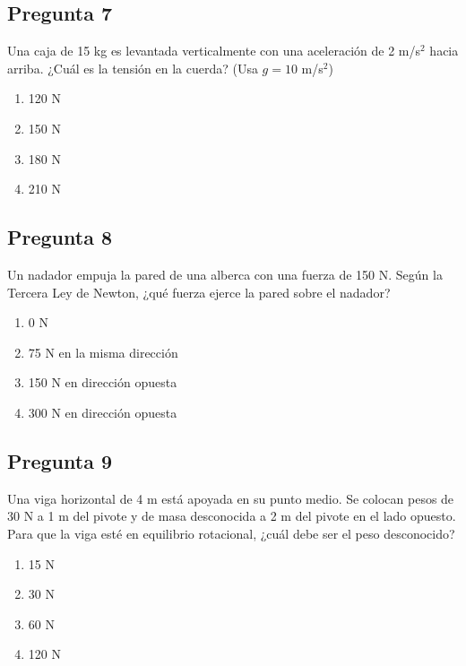 \begin{preguntabox}
\subsection{Pregunta 7}
Una caja de 15 kg es levantada verticalmente con una aceleración de 2 m/s$^2$ hacia arriba. ¿Cuál es la tensión en la cuerda? (Usa $g = 10$ m/s$^2$)

\begin{enumerate}
    \item[A)] 120 N
    \item[B)] 150 N
    \item[C)] 180 N
    \item[D)] 210 N
\end{enumerate}
\end{preguntabox}

\begin{preguntabox}
\subsection{Pregunta 8}
Un nadador empuja la pared de una alberca con una fuerza de 150 N. Según la Tercera Ley de Newton, ¿qué fuerza ejerce la pared sobre el nadador?

\begin{enumerate}
    \item[A)] 0 N
    \item[B)] 75 N en la misma dirección
    \item[C)] 150 N en dirección opuesta
    \item[D)] 300 N en dirección opuesta
\end{enumerate}
\end{preguntabox}

\begin{preguntabox}
\subsection{Pregunta 9}
Una viga horizontal de 4 m está apoyada en su punto medio. Se colocan pesos de 30 N a 1 m del pivote y de masa desconocida a 2 m del pivote en el lado opuesto. Para que la viga esté en equilibrio rotacional, ¿cuál debe ser el peso desconocido?

\begin{enumerate}
    \item[A)] 15 N
    \item[B)] 30 N
    \item[C)] 60 N
    \item[D)] 120 N
\end{enumerate}
\end{preguntabox}


